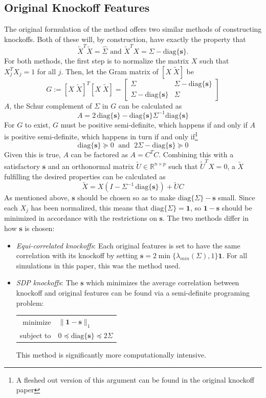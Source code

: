 \documentclass[11pt]{article}
\newcommand{\R}{\mathbb{R}}
\newcommand{\diag}[1]{\mathrm{diag}\{#1\}}
\theoremstyle{definition}
\begin{document}
\subsection{Original Knockoff Features}
    The original formulation of the method offers two similar methods of constructing knockoffs. Both of these will, by construction, have exactly the property that
    \[ \tilde X^T\tilde X=\hat\Sigma \textrm{ and } \tilde X^T X = \Sigma - \diag{\mathbf s}.\]
    For both methods, the first step is to normalize the matrix $X$ such that $X_j^TX_j=1$ for all $j$. Then, let the Gram matrix of $[X\; \tilde X]$ be
    \[ G:= [X\; \tilde X]^T[X\; \tilde X] = \left[ \begin{array}{cc} \Sigma & \Sigma - \diag{\mathbf s} \\ \Sigma - \diag{\mathbf s} & \Sigma \end{array}\right] \]
    $A$, the Schur complement of $\Sigma$ in $G$ can be calculated as 
    \[ A = 2\,\diag{\mathbf s} - \diag{\mathbf s}\Sigma^{-1}\diag{\mathbf s} \]
    For $G$ to exist, $G$ must be positive semi-definite, which happens if and only if $A$ is positive semi-definite, which happens in turn if and only if\footnote{A fleshed out version of this argument can be found in the original knockoff paper} 
    \[ \diag{\mathbf s} \succeq 0  \; \textrm{ and } \; 2\Sigma - \diag{\mathbf s} \succeq 0 \]
    Given this is true, $A$ can be factored as $A=C^TC$. Combining this with a satisfactory $\mathbf s$ and an orthonormal matrix $\tilde U\in\R^{n\times p}$ such that $\tilde U^T X = 0$, a $\tilde X$ fulfilling the desired properties can be calculated as 
    \[ \tilde X = X(I-\Sigma^{-1}\,\diag{\mathbf s}) + \tilde UC\]
    As mentioned above, $\mathbf s$ should be chosen so as to make $\diag{\Sigma}-\mathbf s$ small. Since each $X_j$ has been normalized, this means that $\diag{\Sigma}=\mathbf 1$, so $\mathbf 1 - \mathbf s$ should be minimized in accordance with the restrictions on $\mathbf s$. The two methods differ in how $\mathbf s$ is chosen:
    \begin{itemize}
        \item \textit{Equi-correlated knockoffs}: Each original features is set to have the same correlation with its knockoff by setting $\mathbf s = 2\min\{\lambda_{min}(\Sigma),1\}\mathbf 1$. For all simulations in this paper, this was the method used.
        \item \textit{SDP knockoffs}: The $\mathbf s$ which minimizes the average correlation between knockoff and original features can be found via a semi-definite programing problem:
            \begin{center}
                \begin{tabular}{r l}
                    minimize & $\|\mathbf1-\mathbf s\|_1$ \\
                    subject to & $ 0 \preceq \diag{\mathbf s} \preceq 2\Sigma $
                \end{tabular} 
            \end{center}
            This method is significantly more computationally intensive. 
    \end{itemize}
     
\end{document}

